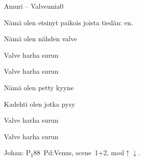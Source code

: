 \documentclass[12pt,a4paper]{article}
\begin{document}
\thispagestyle{empty}
\begin{mysong}{Amuri – Valveunia}{0}

\begin{SBVerse}
  Nämä  olen etsinyt  paikois joista
  tiedän:  en.

  Nämä  olen  nähden 
  valve
\end{SBVerse}

\begin{SBChorus}
  Valve harha surun 

  Valve harha surun 
\end{SBChorus}


\begin{SBVerse}
  Nämä  olen  petty
  kyyne

  Kadehti olen  jotka 
  pysy
\end{SBVerse}

\begin{SBChorus}
  Valve harha surun 

  Valve harha surun 
\end{SBChorus}


{\SBLyricNoteFont Johan: P\textsubscript{1}88~Pd:Venus, scene~1+2,
mod$\uparrow\downarrow$.}

\end{mysong}
\end{document}
